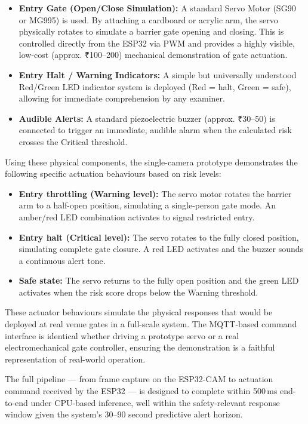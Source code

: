 \documentclass[12pt,a4paper]{article}
\begin{document}
\begin{itemize}[leftmargin=1.5em, itemsep=3pt]
  \item \textbf{Entry Gate (Open/Close Simulation):} A standard Servo Motor (SG90 or MG995) is used. By attaching a cardboard or acrylic arm, the servo physically rotates to simulate a barrier gate opening and closing. This is controlled directly from the ESP32 via PWM and provides a highly visible, low-cost (approx. ₹100–200) mechanical demonstration of gate actuation.
  \item \textbf{Entry Halt / Warning Indicators:} A simple but universally understood Red/Green LED indicator system is deployed (Red = halt, Green = safe), allowing for immediate comprehension by any examiner.
  \item \textbf{Audible Alerts:} A standard piezoelectric buzzer (approx. ₹30–50) is connected to trigger an immediate, audible alarm when the calculated risk crosses the Critical threshold.
\end{itemize}

Using these physical components, the single-camera prototype demonstrates the following specific actuation behaviours based on risk levels:

\begin{itemize}[leftmargin=1.5em, itemsep=3pt]
  \item \textbf{Entry throttling (Warning level):} The servo motor rotates the barrier arm to a half-open position, simulating a single-person gate mode. An amber/red LED combination activates to signal restricted entry.
  \item \textbf{Entry halt (Critical level):} The servo rotates to the fully closed position, simulating complete gate closure. A red LED activates and the buzzer sounds a continuous alert tone.
  \item \textbf{Safe state:} The servo returns to the fully open position and the green LED activates when the risk score drops below the Warning threshold.
\end{itemize}

These actuator behaviours simulate the physical responses that would be deployed at real venue gates in a full-scale system. The MQTT-based command interface is identical whether driving a prototype servo or a real electromechanical gate controller, ensuring the demonstration is a faithful representation of real-world operation.

The full pipeline — from frame capture on the ESP32-CAM to actuation command received by the ESP32 — is designed to complete within 500\,ms end-to-end under CPU-based inference, well within the safety-relevant response window given the system's 30--90 second predictive alert horizon.
\end{document}
